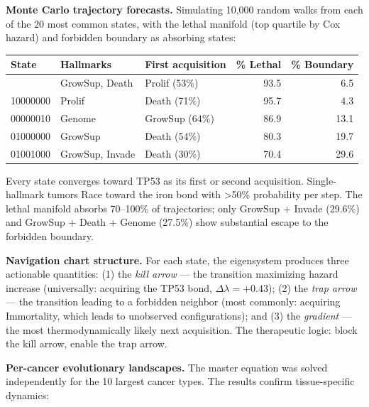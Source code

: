 \documentclass[
  11pt,
]{article}
\newcounter{none} %
\begin{document}
\textbf{Monte Carlo trajectory forecasts.} Simulating 10,000 random
walks from each of the 20 most common states, with the lethal manifold
(top quartile by Cox hazard) and forbidden boundary as absorbing states:

{\def\LTcaptype{none} %
\begin{longtable}[]{@{}lllrr@{}}
\toprule\noalign{}
State & Hallmarks & First acquisition & \% Lethal & \% Boundary \\
\midrule\noalign{}
\endhead
\bottomrule\noalign{}
\endlastfoot
01100000 & GrowSup, Death & Prolif (53\%) & 93.5 & 6.5 \\
10000000 & Prolif & Death (71\%) & 95.7 & 4.3 \\
00000010 & Genome & GrowSup (64\%) & 86.9 & 13.1 \\
01000000 & GrowSup & Death (54\%) & 80.3 & 19.7 \\
01001000 & GrowSup, Invade & Death (30\%) & 70.4 & 29.6 \\
\end{longtable}
}

Every state converges toward TP53 as its first or second acquisition.
Single-hallmark tumors Race toward the iron bond with \textgreater50\%
probability per step. The lethal manifold absorbs 70--100\% of
trajectories; only GrowSup + Invade (29.6\%) and GrowSup + Death +
Genome (27.5\%) show substantial escape to the forbidden boundary.

\textbf{Navigation chart structure.} For each state, the eigensystem
produces three actionable quantities: (1) the \emph{kill arrow} --- the
transition maximizing hazard increase (universally: acquiring the TP53
bond, \(\Delta\lambda = +0.43\)); (2) the \emph{trap arrow} --- the
transition leading to a forbidden neighbor (most commonly: acquiring
Immortality, which leads to unobserved configurations); and (3) the
\emph{gradient} --- the most thermodynamically likely next acquisition.
The therapeutic logic: block the kill arrow, enable the trap arrow.

\textbf{Per-cancer evolutionary landscapes.} The master equation was
solved independently for the 10 largest cancer types. The results
confirm tissue-specific dynamics:
\end{document}
